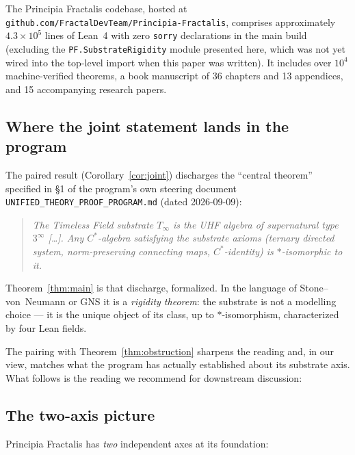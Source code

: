 \documentclass[11pt,a4paper]{article}
\theoremstyle{plain}
\theoremstyle{definition}
\begin{document}
The Principia Fractalis codebase, hosted at \texttt{github.com/FractalDevTeam/Principia-Fractalis}, comprises approximately $4.3 \times 10^5$ lines of Lean~4 with zero \texttt{sorry} declarations in the main build (excluding the \texttt{PF.SubstrateRigidity} module presented here, which was not yet wired into the top-level import when this paper was written). It includes over $10^4$ machine-verified theorems, a book manuscript of 36 chapters and 13 appendices, and 15 accompanying research papers.

\subsection*{Where the joint statement lands in the program}

The paired result (Corollary~\ref{cor:joint}) discharges the ``central theorem'' specified in \S 1 of the program's own steering document \texttt{UNIFIED\_THEORY\_PROOF\_PROGRAM.md} (dated 2026-09-09):

\begin{quote}\itshape
The Timeless Field substrate $T_{\infty}$ is the UHF algebra of supernatural type $3^{\infty}$ [\ldots]. Any $C^{\ast}$-algebra satisfying the substrate axioms (ternary directed system, norm-preserving connecting maps, $C^{\ast}$-identity) is $\ast$-isomorphic to it.
\end{quote}

\noindent
Theorem~\ref{thm:main} is that discharge, formalized. In the language of Stone--von~Neumann or GNS it is a \emph{rigidity theorem}: the substrate is not a modelling choice --- it is the unique object of its class, up to $\ast$-isomorphism, characterized by four Lean fields.

The pairing with Theorem~\ref{thm:obstruction} sharpens the reading and, in our view, matches what the program has actually established about its substrate axis. What follows is the reading we recommend for downstream discussion:

\subsection*{The two-axis picture}

Principia Fractalis has \emph{two} independent axes at its foundation:
\end{document}
